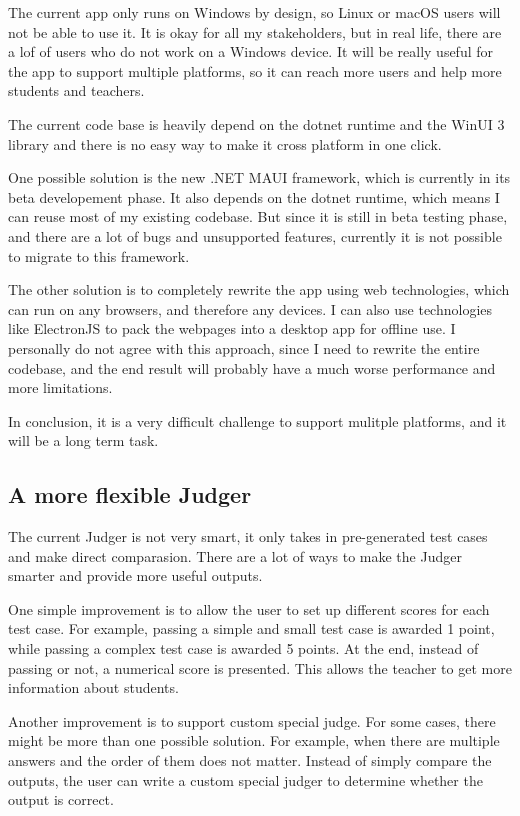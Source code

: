 \documentclass[a4paper]{report}
\begin{document}
The current app only runs on Windows by design, so Linux or macOS users will not be able to use it. It is okay for all my stakeholders, but in real life, there are a lof of users who do not work on a Windows device. It will be really useful for the app to support multiple platforms, so it can reach more users and help more students and teachers.

The current code base is heavily depend on the dotnet runtime and the WinUI 3 library and there is no easy way to make it cross platform in one click.

One possible solution is the new .NET MAUI framework\cite{microsoft:docs:what-is-maui}, which is currently in its beta developement phase. It also depends on the dotnet runtime, which means I can reuse most of my existing codebase. But since it is still in beta testing phase, and there are a lot of bugs and unsupported features, currently it is not possible to migrate to this framework.

The other solution is to completely rewrite the app using web technologies, which can run on any browsers, and therefore any devices. I can also use technologies like ElectronJS\cite{electron} to pack the webpages into a desktop app for offline use. I personally do not agree with this approach, since I need to rewrite the entire codebase, and the end result will probably have a much worse performance and more limitations.

In conclusion, it is a very difficult challenge to support mulitple platforms, and it will be a long term task.

\subsection{A more flexible Judger}

The current Judger is not very smart, it only takes in pre-generated test cases and make direct comparasion. There are a lot of ways to make the Judger smarter and provide more useful outputs.

One simple improvement is to allow the user to set up different scores for each test case. For example, passing a simple and small test case is awarded 1 point, while passing a complex test case is awarded 5 points. At the end, instead of passing or not, a numerical score is presented. This allows the teacher to get more information about students.

Another improvement is to support custom special judge. For some cases, there might be more than one possible solution. For example, when there are multiple answers and the order of them does not matter. Instead of simply compare the outputs, the user can write a custom special judger to determine whether the output is correct.
\end{document}
